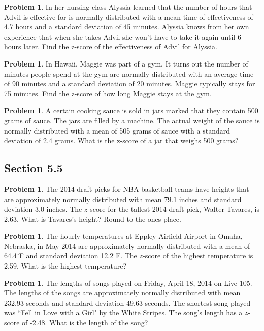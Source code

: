 \documentclass[11pt]{scrartcl}
\theoremstyle{definition}
\newtheorem{problem}[theorem]{Problem}
\begin{document}
\begin{problem}
	In her nursing class Alyssia learned that the number of hours that Advil is effective for is normally distributed with a mean time of effectiveness of 4.7 hours and a standard deviation of 45 minutes. Alyssia knows from her own experience that when she takes Advil she won't have to take it again until 6 hours later. Find the z-score of the effectiveness of Advil for Alyssia. 
\end{problem}


\begin{problem}
	In Hawaii, Maggie was part of a gym. It turns out the number of minutes people spend at the gym are normally distributed with an average time of 90 minutes and a standard deviation of 20 minutes. Maggie typically stays for 75 minutes. Find the z-score of how long Maggie stays at the gym.	
\end{problem}

\begin{problem}
	A certain cooking sauce is sold in jars marked that they contain 500 grams of sauce. The jars are filled by a machine. The actual weight of the sauce is normally distributed with a mean of 505 grams of sauce with a standard deviation of 2.4 grams. What is the z-score of a jar that weighs 500 grams?	
\end{problem}

\newpage

\subsection*{Section 5.5}
\begin{problem}
	The 2014 draft picks for NBA basketball teams have heights that are approximately normally distributed with mean 79.1 inches and standard deviation 3.0 inches. The $z$-score for the tallest 2014 draft pick, Walter Tavares, is 2.63. What is Tavares's height? Round to the ones place.
\end{problem}

\begin{problem}
	The hourly temperatures at Eppley Airfield Airport in Omaha, Nebraska, in May 2014 are approximately normally distributed with a mean of 64.4$^\circ$F and standard deviation 12.2$^\circ$F. The $z$-score of the highest temperature is 2.59. What is the highest temperature?	
\end{problem}

\begin{problem}
	The lengths of songs played on Friday, April 18, 2014 on Live 105. The lengths of the songs are approximately normally distributed with mean 232.93 seconds and standard deviation 49.63 seconds. The shortest song played was ``Fell in Love with a Girl" by the White Stripes. The song's length has a $z$-score of -2.48. What is the length of the song?
\end{problem}
\end{document}
